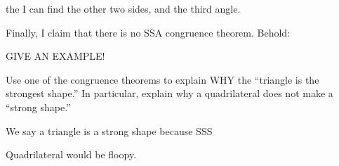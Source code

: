 \documentclass{ximera}
\begin{document}
\begin{question}
\begin{freeResponse}
\begin{description}
\begin{center}
      \end{center} the I can find the other two sides, and the third angle.
    \end{description}



    Finally, I claim that there is no SSA congruence theorem. Behold:

    \begin{center}
      GIVE AN EXAMPLE!
    \end{center}
    
  \end{freeResponse}
\end{question}


\begin{question}
  Use one of the congruence theorems to explain WHY the ``triangle is
  the strongest shape.''  In particular, explain why a
  quadrilateral does not make a ``strong shape.''
  \begin{freeResponse}
    We say a triangle is a strong shape because SSS

    Quadrilateral would be floopy.
  \end{freeResponse}
\end{question}
\end{document}
